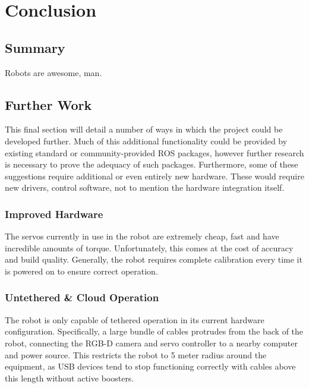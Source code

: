 \chapter{Conclusion}
\label{chap:conclusion}


\section{Summary}
Robots are awesome, man.


\section{Further Work}

This final section will detail a number of ways in which the project could be developed further. Much of this additional functionality could be provided by existing standard or community-provided ROS packages, however further research is necessary to prove the adequacy of such packages. Furthermore, some of these suggestions require additional or even entirely new hardware. These would require new drivers, control software, not to mention the hardware integration itself.

\subsection{Improved Hardware}
The servos currently in use in the robot are extremely cheap, fast and have incredible amounts of torque. Unfortunately, this comes at the cost of accuracy and build quality. Generally, the robot requires complete calibration every time it is powered on to ensure correct operation.

\subsection{Untethered \& Cloud Operation}
The robot is only capable of tethered operation in its current hardware configuration. Specifically, a large bundle of cables protrudes from the back of the robot, connecting the RGB-D camera and servo controller to a nearby computer and power source. This restricts the robot to 5 meter radius around the equipment, as USB devices tend to stop functioning correctly with cables above this length without active boosters. 

